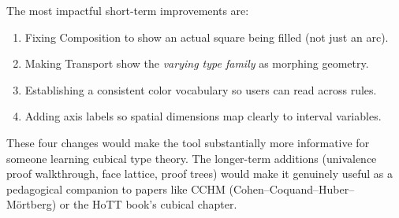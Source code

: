 \documentclass[11pt, a4paper]{article}
\begin{document}
The most impactful short-term improvements are:
\begin{enumerate}
  \item Fixing Composition to show an actual square being filled (not just an arc).
  \item Making Transport show the \emph{varying type family} as morphing geometry.
  \item Establishing a consistent color vocabulary so users can read across rules.
  \item Adding axis labels so spatial dimensions map clearly to interval variables.
\end{enumerate}

These four changes would make the tool substantially more informative for someone
learning cubical type theory. The longer-term additions (univalence proof walkthrough,
face lattice, proof trees) would make it genuinely useful as a pedagogical companion
to papers like CCHM (Cohen--Coquand--Huber--M\"ortberg) or the HoTT book's cubical
chapter.
\end{document}
